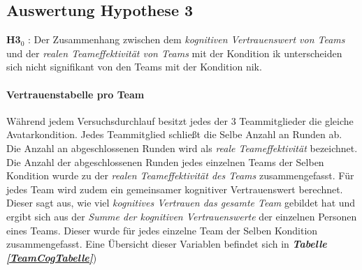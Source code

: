 \documentclass[a4paper,11pt]{article}%
\renewcommand{\\}{\vspace*{0.5\baselineskip} \newline}
\begin{document}
\subsection{Auswertung Hypothese 3}
\textbf{H3$_{0}$} : Der Zusammenhang zwischen dem \textit{kognitiven Vertrauenswert von Teams} und der \textit{realen Teameffektivität von Teams} mit der Kondition \ac{ik} unterscheiden sich nicht signifikant von den Teams mit der Kondition \ac{nik}.
%
%
%
\paragraph{Vertrauenstabelle pro Team}
Während jedem Versuchsdurchlauf besitzt jedes der 3 Teammitglieder die gleiche Avatarkondition. Jedes Teammitglied schließt die Selbe Anzahl an Runden ab. Die Anzahl an abgeschlossenen Runden wird als \textit{reale Teameffektivität} bezeichnet. Die Anzahl der abgeschlossenen Runden jedes einzelnen Teams der Selben Kondition wurde zu der \textit{realen Teameffektivität des Teams} zusammengefasst. 
Für jedes Team wird zudem ein gemeinsamer kognitiver Vertrauenswert berechnet. Dieser sagt aus, wie viel \textit{kognitives Vertrauen das gesamte Team} gebildet hat und ergibt sich aus der \textit{Summe der kognitiven Vertrauenswerte} der einzelnen Personen eines Teams. Dieser wurde für jedes einzelne Team der Selben Kondition zusammengefasst. Eine Übersicht dieser Variablen befindet sich in \textbf{\textit{Tabelle \ref{TeamCogTabelle}}})
\end{document}
